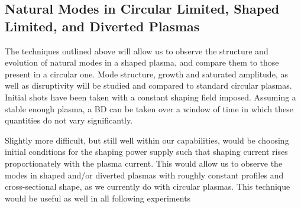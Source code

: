 \documentclass[aps,preprint,showpacs,superscriptaddress,groupedaddress]{revtex4}  %
\begin{document}
	\subsection{Natural Modes in Circular Limited, Shaped Limited, and Diverted Plasmas}		
	The techniques outlined above will allow us to observe the structure and evolution of natural modes in a shaped plasma, and compare them to those present in a circular one.  Mode structure, growth and saturated amplitude, as well as disruptivity will be studied and compared to standard circular plasmas. Initial shots have been taken with a constant shaping field imposed.  Assuming a stable enough plasma, a BD can be taken over a window of time in which these quantities do not vary significantly.\par
	Slightly more difficult, but still well within our capabilities, would be choosing initial conditions for the shaping power supply such that shaping current rises proportionately with the plasma current.  This would allow us to observe the modes in shaped and/or diverted plasmas with roughly constant profiles and cross-sectional shape, as we currently do with circular plasmas.  This technique would be useful as well in all following experiments\par
\end{document}
